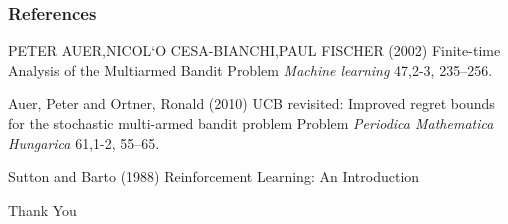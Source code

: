 \documentclass{beamer}
\begin{document}
\begin{frame}
\frametitle{References}
\footnotesize{
\begin{thebibliography}{99} %
 PETER AUER,NICOL`O CESA-BIANCHI,PAUL FISCHER (2002)
\newblock Finite-time Analysis of the Multiarmed Bandit
Problem
\newblock \emph{Machine learning} 47,2-3, 235--256.

 Auer, Peter and Ortner, Ronald (2010)
\newblock UCB revisited: Improved regret bounds for the stochastic multi-armed bandit problem
Problem
\newblock \emph{Periodica Mathematica Hungarica} 61,1-2, 55--65.

 Sutton and Barto (1988)
\newblock Reinforcement Learning: An Introduction
\end{thebibliography}
}
\end{frame}




\begin{frame}
\Huge{\centerline{Thank You}}
\end{frame}

\end{document}
